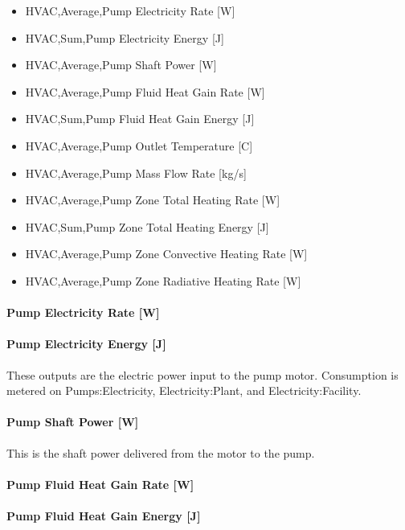 \begin{itemize}
\item
  HVAC,Average,Pump Electricity Rate {[}W{]}
\item
  HVAC,Sum,Pump Electricity Energy {[}J{]}
\item
  HVAC,Average,Pump Shaft Power {[}W{]}
\item
  HVAC,Average,Pump Fluid Heat Gain Rate {[}W{]}
\item
  HVAC,Sum,Pump Fluid Heat Gain Energy {[}J{]}
\item
  HVAC,Average,Pump Outlet Temperature {[}C{]}
\item
  HVAC,Average,Pump Mass Flow Rate {[}kg/s{]}
\item
  HVAC,Average,Pump Zone Total Heating Rate {[}W{]}
\item
  HVAC,Sum,Pump Zone Total Heating Energy {[}J{]}
\item
  HVAC,Average,Pump Zone Convective Heating Rate {[}W{]}
\item
  HVAC,Average,Pump Zone Radiative Heating Rate {[}W{]}
\end{itemize}

\paragraph{Pump Electricity Rate {[}W{]}}\label{pump-electric-power-w}

\paragraph{Pump Electricity Energy {[}J{]}}\label{pump-electric-energy-j}

These outputs are the electric power input to the pump motor. Consumption is metered on Pumps:Electricity, Electricity:Plant, and Electricity:Facility.

\paragraph{Pump Shaft Power {[}W{]}}\label{pump-shaft-power-w}

This is the shaft power delivered from the motor to the pump.

\paragraph{Pump Fluid Heat Gain Rate {[}W{]}}\label{pump-fluid-heat-gain-rate-w}

\paragraph{Pump Fluid Heat Gain Energy {[}J{]}}\label{pump-fluid-heat-gain-energy-j}

